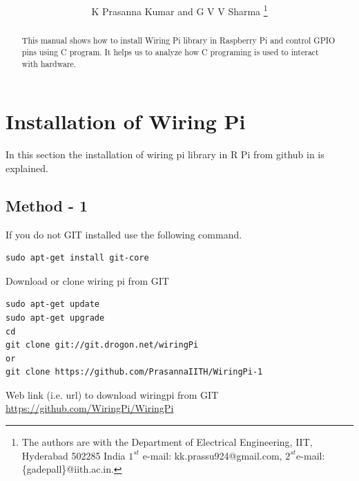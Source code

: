 \documentclass[journal,12pt,twocolumn]{IEEEtran}
\begin{document}

 
 

\title{
} 
 
%
%
%


\author{K Prasanna Kumar and G V V Sharma %
\thanks{The authors are with the Department
of Electrical Engineering, IIT, Hyderabad
502285 India $1^{st}$ e-mail: kk.prassu924@gmail.com, $2^{st}$e-mail: \{gadepall\}@iith.ac.in. 
}}


\maketitle


\tableofcontents

\bigskip

\begin{abstract}
This manual shows how to install Wiring Pi library in Raspberry Pi and control GPIO pins using C program. It helps us to analyze how C programing is used to interact with hardware.  
\end{abstract}
\section{Installation of Wiring Pi}
In this section the installation of wiring pi library in R Pi from github in is explained.\\
\subsection*{Method - 1}
If you do not GIT installed use the following command.
\begin{lstlisting}[frame = single]
 sudo apt-get install git-core
\end{lstlisting}
Download or clone wiring pi from GIT
\begin{lstlisting}[frame = single]
sudo apt-get update
sudo apt-get upgrade
cd 
git clone git://git.drogon.net/wiringPi
or 
git clone https://github.com/PrasannaIITH/WiringPi-1
\end{lstlisting}
Web link (i.e. url) to download wiringpi from GIT
\url{https://github.com/WiringPi/WiringPi}\\
\end{document}
